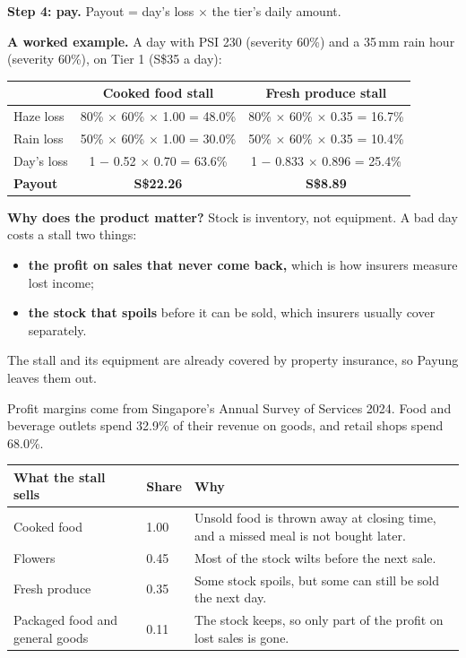 \documentclass[11pt,a4paper]{article}
\newcommand{\head}{\rowcolor{soft}}
\newcommand{\sgd}{\textup{S\$}}
\begin{document}
\textbf{Step 4: pay.} \quad Payout \;=\; day's loss \;$\times$\; the tier's daily amount.

\textbf{A worked example.} A day with PSI 230 (severity 60\%) and a 35\,mm rain hour (severity 60\%), on Tier 1 (\sgd 35 a day):

\begin{center}
\small
\begin{tabular}{|l|c|c|}
\hline
\head & \textbf{Cooked food stall} & \textbf{Fresh produce stall} \\
\hline
Haze loss & 80\% $\times$ 60\% $\times$ 1.00 = 48.0\% & 80\% $\times$ 60\% $\times$ 0.35 = 16.7\% \\
\hline
Rain loss & 50\% $\times$ 60\% $\times$ 1.00 = 30.0\% & 50\% $\times$ 60\% $\times$ 0.35 = 10.4\% \\
\hline
Day's loss & 1 $-$ 0.52 $\times$ 0.70 = 63.6\% & 1 $-$ 0.833 $\times$ 0.896 = 25.4\% \\
\hline
\textbf{Payout} & \textbf{\sgd 22.26} & \textbf{\sgd 8.89} \\
\hline
\end{tabular}
\end{center}

\textbf{Why does the product matter?} Stock is inventory, not equipment. A bad day costs a stall two things:
\begin{itemize}[leftmargin=1.2em]
  \item \textbf{the profit on sales that never come back,} which is how insurers measure lost income;\cite{marsh}
  \item \textbf{the stock that spoils} before it can be sold, which insurers usually cover separately.\cite{zurich}
\end{itemize}
The stall and its equipment are already covered by property insurance, so Payung leaves them out.
\begin{center}
\end{center}
Profit margins come from Singapore's Annual Survey of Services 2024. Food and beverage outlets spend 32.9\% of their revenue on goods, and retail shops spend 68.0\%.\cite{singstat}

{\small
\begin{xltabular}{\textwidth}{|K{3.6cm}|C{1.6cm}|Y|}
\hline
\head What the stall sells & \textbf{Share} & \textbf{Why} \\
\hline
\endhead
Cooked food & 1.00 & Unsold food is thrown away at closing time, and a missed meal is not bought later. \\
\hline
Flowers & 0.45 & Most of the stock wilts before the next sale. \\
\hline
Fresh produce & 0.35 & Some stock spoils, but some can still be sold the next day. \\
\hline
Packaged food and general goods & 0.11 & The stock keeps, so only part of the profit on lost sales is gone. \\
\hline
\end{xltabular}}
\end{document}
